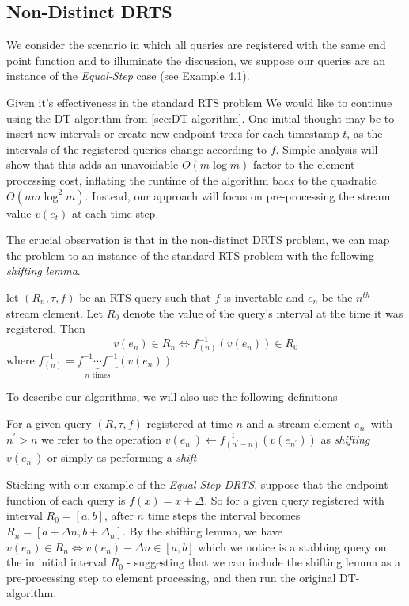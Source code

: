 \subsection{Non-Distinct DRTS}
\label{ssec:non-distinct-rts}

We consider the scenario in which all queries are registered with the same end point function and to illuminate the discussion, we suppose our queries are an instance of the \textit{Equal-Step} case (see Example 4.1). 

Given it's effectiveness in the standard RTS problem We would like to continue using the DT algorithm from \cref{sec:DT-algorithm}. One initial thought may be to insert new intervals or create new endpoint trees for each timestamp $t$, as the intervals of the registered queries change according to $f$. Simple analysis will show that this adds an unavoidable $O(m\log m)$ factor to the element processing cost, inflating the runtime of the algorithm back to the quadratic $O(nm\log^2 m)$. Instead, our approach will focus on pre-processing the stream value $v(e_t)$ at each time step. 

The crucial observation is that in the non-distinct DRTS problem, we can map the problem to an instance of the standard RTS problem with the following \textit{shifting lemma}. 

\begin{lemma}
    let $(R_n, \tau, f)$ be an RTS query such that $f$ is invertable and $e_n$ be the $n^{th}$ stream element. Let $R_0$ denote the value of the query's interval at the time it was registered. Then 
    $$v(e_n) \in R_n \iff f^{-1}_{(n)}(v(e_n))\in R_0$$
    where $f^{-1}_{(n)} = \underbrace{f^{-1}\cdots f^{-1}}_{n \text{ times}}(v(e_n))$
\end{lemma}

To describe our algorithms, we will also use the following definitions

\begin{definition}
    For a given query $(R, \tau, f)$ registered at time $n$ and a stream element $e_{n^\prime}$ with $n^\prime > n$ we refer to the operation $v(e_{n^\prime})\gets f^{-1}_{(n^\prime - n)}(v(e_{n^\prime}))$ as \textit{shifting $v(e_{n^\prime})$} or simply as performing a \textit{shift}
\end{definition}

Sticking with our example of the \textit{Equal-Step DRTS}, suppose that the endpoint function of each query is $f(x) = x+\Delta$. So for a given query registered with interval $R_0 = [a,b]$, after $n$ time steps the interval becomes $R_n = [a + \Delta n, b+\Delta_n]$. By the shifting lemma, we have $v(e_n) \in R_n \iff v(e_n) - \Delta n \in [a,b]$ which we notice is a stabbing query on the in initial interval $R_0$ - suggesting that we can include the shifting lemma as a pre-processing step to element processing, and then run the original DT-algorithm.

